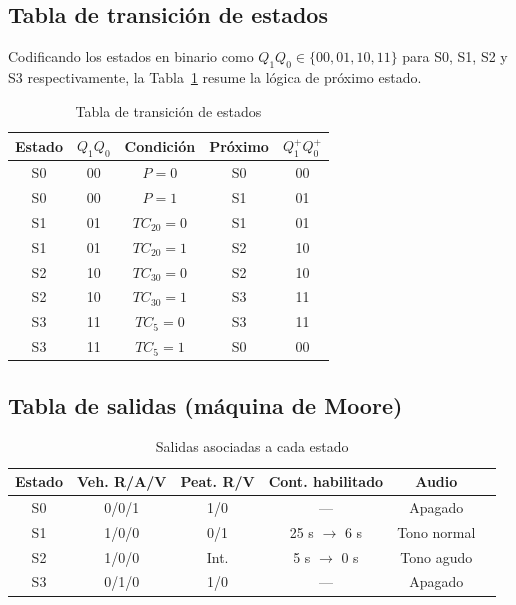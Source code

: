 \documentclass[10pt,onecolumn]{IEEEtran}
\begin{document}
\subsection{Tabla de transición de estados}
Codificando los estados en binario como $Q_1 Q_0 \in \{00,01,10,11\}$ para S0, S1, S2 y S3 respectivamente, la Tabla~\ref{tab:transicion} resume la lógica de próximo estado.

\begin{table}[H]
\centering
\caption{Tabla de transición de estados}
\label{tab:transicion}
\begin{tabular}{ccccc}
\toprule
\textbf{Estado} & \textbf{$Q_1Q_0$} & \textbf{Condición} & \textbf{Próximo} & \textbf{$Q_1^+Q_0^+$} \\
\midrule
S0 & 00 & $P=0$  & S0 & 00 \\
S0 & 00 & $P=1$  & S1 & 01 \\
S1 & 01 & $TC_{20}=0$ & S1 & 01 \\
S1 & 01 & $TC_{20}=1$ & S2 & 10 \\
S2 & 10 & $TC_{30}=0$ & S2 & 10 \\
S2 & 10 & $TC_{30}=1$ & S3 & 11 \\
S3 & 11 & $TC_{5}=0$  & S3 & 11 \\
S3 & 11 & $TC_{5}=1$  & S0 & 00 \\
\bottomrule
\end{tabular}
\end{table}

\subsection{Tabla de salidas (máquina de Moore)}
\begin{table}[H]
\centering
\caption{Salidas asociadas a cada estado}
\label{tab:salidas}
\begin{tabular}{cccccc}
\toprule
\textbf{Estado} & \textbf{Veh. R/A/V} & \textbf{Peat. R/V} & \textbf{Cont. habilitado} & \textbf{Audio} \\
\midrule
S0 & 0/0/1 & 1/0  & ---             & Apagado \\
S1 & 1/0/0 & 0/1  & 25 s $\to$ 6 s  & Tono normal \\
S2 & 1/0/0 & Int. & 5 s $\to$ 0 s   & Tono agudo \\
S3 & 0/1/0 & 1/0  & ---             & Apagado \\
\bottomrule
\end{tabular}
\end{table}
\end{document}
